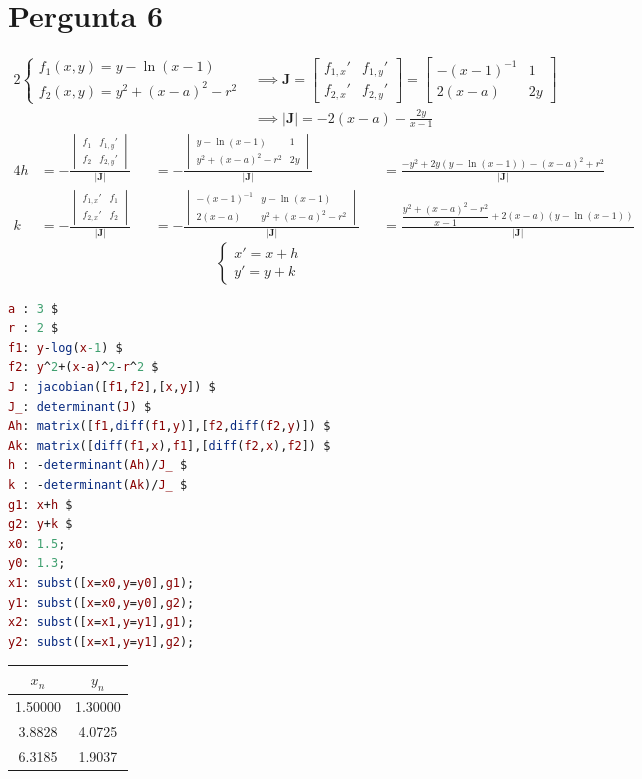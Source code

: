 \section{Pergunta 6}
\begin{alignat*}{2}
	\begin{cases}
		f_1(x,y)=y-\ln(x-1)\\
		f_2(x,y)=y^2+(x-a)^2-r^2
	\end{cases}
	&\implies
	\mathbf{J}=\begin{bmatrix}
  		f_{1,x}' & f_{1,y}'\\
  		f_{2,x}' & f_{2,y}'
	\end{bmatrix}=\begin{bmatrix}
  		-(x-1)^{-1} & 1\\
  		2(x-a)      & 2y
	\end{bmatrix}\\
	&\implies
	|\mathbf{J}|=-2(x-a)-\frac{2y}{x-1}
\end{alignat*}
\begin{alignat*}{4}
	h&=-\frac{
		\begin{vmatrix}
			f_1 & f_{1,y}' \\
			f_2 & f_{2,y}'
		\end{vmatrix}}
		{|\mathbf{J}|}
	   &&=-\frac{
		\begin{vmatrix}
			y-\ln(x-1)      & 1 \\
			y^2+(x-a)^2-r^2 & 2y
		\end{vmatrix}}
		{|\mathbf{J}|}
	   &&=\frac{-y^2+2y(y-\ln(x-1))-(x-a)^2+r^2}{|\mathbf{J}|}\\
	k&=-\frac{
		\begin{vmatrix}
			f_{1,x}' & f_1 \\
			f_{2,x}' & f_2
		\end{vmatrix}}
		{|\mathbf{J}|}
	   &&=-\frac{
		\begin{vmatrix}
			-(x-1)^{-1} & y-\ln(x-1)      \\
			2(x-a)      & y^2+(x-a)^2-r^2
		\end{vmatrix}}
		{|\mathbf{J}|}
	   &&=\frac{\dfrac{y^2+(x-a)^2-r^2}{x-1}+2(x-a)(y-\ln(x-1))}{|\mathbf{J}|}
\end{alignat*}
\begin{equation*}
	\begin{cases}
		x'=x+h\\
		y'=y+k
	\end{cases}
\end{equation*}
\begin{lstlisting}[language=Maxima, caption=Comandos 2012T1-6 (MAXIMA)]
a : 3 $
r : 2 $
f1: y-log(x-1) $
f2: y^2+(x-a)^2-r^2 $
J : jacobian([f1,f2],[x,y]) $
J_: determinant(J) $
Ah: matrix([f1,diff(f1,y)],[f2,diff(f2,y)]) $
Ak: matrix([diff(f1,x),f1],[diff(f2,x),f2]) $
h : -determinant(Ah)/J_ $
k : -determinant(Ak)/J_ $
g1: x+h $
g2: y+k $
x0: 1.5;
y0: 1.3;
x1: subst([x=x0,y=y0],g1);
y1: subst([x=x0,y=y0],g2);
x2: subst([x=x1,y=y1],g1);
y2: subst([x=x1,y=y1],g2);
\end{lstlisting}
\begin{center}
\begin{tabular}{c | c}
	$x_n$   & $y_n$   \\ \hline
	1.50000 & 1.30000 \\
	3.8828  & 4.0725  \\
	6.3185  & 1.9037 
\end{tabular}
\end{center}
